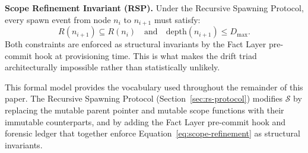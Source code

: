 \medskip
\noindent\textbf{Scope Refinement Invariant (RSP).}
Under the Recursive Spawning Protocol, every spawn event from node $n_i$ to $n_{i+1}$ must satisfy:
\begin{equation}
R(n_{i+1}) \subseteq R(n_i) \quad \text{and} \quad \mathrm{depth}(n_{i+1}) \leq D_{\max}.
\label{eq:scope-refinement}
\end{equation}
Both constraints are enforced as structural invariants by the Fact Layer pre-commit hook at provisioning time. This is what makes the drift triad architecturally impossible rather than statistically unlikely.

This formal model provides the vocabulary used throughout the remainder of this paper. The Recursive Spawning Protocol (Section~\ref{sec:rs-protocol}) modifies $\mathcal{S}$ by replacing the mutable parent pointer and mutable scope functions with their immutable counterparts, and by adding the Fact Layer pre-commit hook and forensic ledger that together enforce Equation~\ref{eq:scope-refinement} as structural invariants.